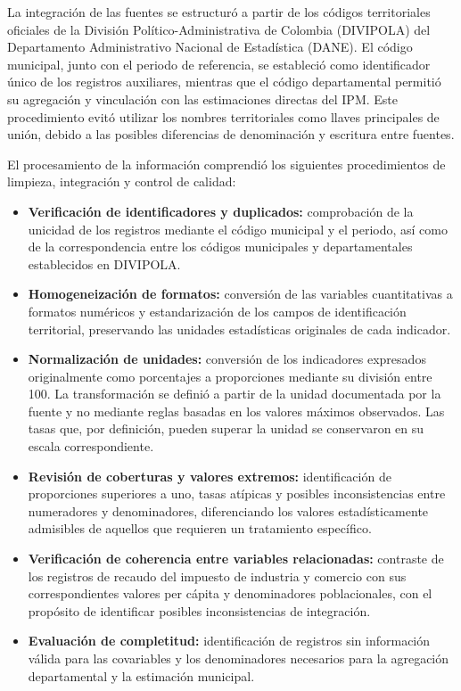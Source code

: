 La integración de las fuentes se estructuró a partir de los códigos territoriales oficiales de la División Político-Administrativa de Colombia (DIVIPOLA) del Departamento Administrativo Nacional de Estadística (DANE). El código municipal, junto con el periodo de referencia, se estableció como identificador único de los registros auxiliares, mientras que el código departamental permitió su agregación y vinculación con las estimaciones directas del IPM. Este procedimiento evitó utilizar los nombres territoriales como llaves principales de unión, debido a las posibles diferencias de denominación y escritura entre fuentes.

El procesamiento de la información comprendió los siguientes procedimientos de limpieza, integración y control de calidad:

\begin{itemize}
    \item \textbf{Verificación de identificadores y duplicados:} comprobación de la unicidad de los registros mediante el código municipal y el periodo, así como de la correspondencia entre los códigos municipales y departamentales establecidos en DIVIPOLA.

    \item \textbf{Homogeneización de formatos:} conversión de las variables cuantitativas a formatos numéricos y estandarización de los campos de identificación territorial, preservando las unidades estadísticas originales de cada indicador.

    \item \textbf{Normalización de unidades:} conversión de los indicadores expresados originalmente como porcentajes a proporciones mediante su división entre 100. La transformación se definió a partir de la unidad documentada por la fuente y no mediante reglas basadas en los valores máximos observados. Las tasas que, por definición, pueden superar la unidad se conservaron en su escala correspondiente.

    \item \textbf{Revisión de coberturas y valores extremos:} identificación de proporciones superiores a uno, tasas atípicas y posibles inconsistencias entre numeradores y denominadores, diferenciando los valores estadísticamente admisibles de aquellos que requieren un tratamiento específico.

    \item \textbf{Verificación de coherencia entre variables relacionadas:} contraste de los registros de recaudo del impuesto de industria y comercio con sus correspondientes valores per cápita y denominadores poblacionales, con el propósito de identificar posibles inconsistencias de integración.

    \item \textbf{Evaluación de completitud:} identificación de registros sin información válida para las covariables y los denominadores necesarios para la agregación departamental y la estimación municipal.
\end{itemize}

